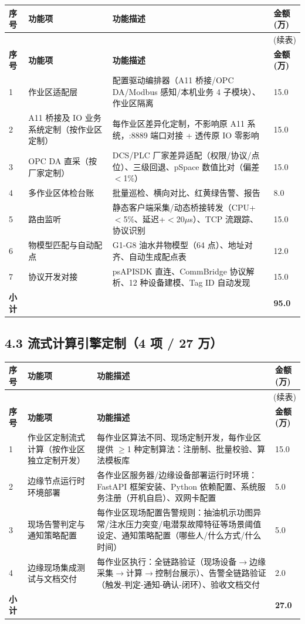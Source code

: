 \documentclass[11pt,a4paper]{ctexart}
\begin{document}
\begin{longtable}{p{1.2cm} p{3.8cm} p{7.1cm} p{1.7cm}}
\toprule
\textbf{序号} & \textbf{功能项} & \textbf{功能描述} & \textbf{金额(万)} \\
\midrule
\endfirsthead
\midrule
\multicolumn{4}{r}{(续表)} \\
\toprule
\textbf{序号} & \textbf{功能项} & \textbf{功能描述} & \textbf{金额(万)} \\
\midrule
\endhead
1 & 作业区适配层 & 配置驱动编排器（A11 桥接/OPC DA/Modbus 感知/本机业务 4 子模块）、作业区隔离 & 15.0 \\
2 & A11 桥接及 IO 业务系统定制（按作业区定制） & 每作业区差异化定制，不影响原 A11 系统，:8889 端口对接 + 透传原 IO 零影响 & 15.0 \\
3 & OPC DA 直采（按厂家定制） & DCS/PLC 厂家差异适配（权限/协议/点位）、三级回退、pSpace 数值比对（偏差 $<$1\%） & 15.0 \\
4 & 多作业区体检台账 & 批量巡检、横向对比、红黄绿告警、报告 & 8.0 \\
5 & 路由监听 & 静态客户端采集/动态桥接转发（CPU+$<$5\%、延迟+$<$20$\mu$s）、TCP 流跟踪、协议识别 & 15.0 \\
6 & 物模型匹配与自动配点 & G1-G8 油水井物模型（64 点）、地址对齐、自动生成配点表 & 12.0 \\
7 & 协议开发对接 & psAPISDK 直连、CommBridge 协议解析、12 种设备建模、Tag ID 自动发现 & 15.0 \\
\midrule
\textbf{小计} & & & \textbf{95.0} \\
\bottomrule
\end{longtable}

\subsection{4.3 流式计算引擎定制（4 项 / 27 万）}

\begin{longtable}{p{1.2cm} p{3.8cm} p{7.1cm} p{1.7cm}}
\toprule
\textbf{序号} & \textbf{功能项} & \textbf{功能描述} & \textbf{金额(万)} \\
\midrule
\endfirsthead
\midrule
\multicolumn{4}{r}{(续表)} \\
\toprule
\textbf{序号} & \textbf{功能项} & \textbf{功能描述} & \textbf{金额(万)} \\
\midrule
\endhead
1 & 作业区定制流式计算（按作业区独立定制开发） & 每作业区算法不同、现场定制开发，每作业区提供 $\geq$1 种定制算法：注册制、批量校验、算法模板库 & 15.0 \\
2 & 边缘节点运行时环境部署 & 各作业区服务器/边缘设备部署运行时环境：FastAPI 框架安装、Python 依赖配置、系统服务注册（开机自启）、双网卡配置 & 5.0 \\
3 & 现场告警判定与通知策略配置 & 每作业区现场配置告警规则：抽油机示功图异常/注水压力突变/电潜泵故障特征等场景阈值设定、通知策略配置（哪些人/什么方式/什么时间） & 5.0 \\
4 & 边缘现场集成测试与文档交付 & 每作业区执行：全链路验证（现场设备$\rightarrow$边缘采集$\rightarrow$计算$\rightarrow$控制台展示）、告警全链路验证（触发-判定-通知-确认-闭环）、验收文档交付 & 2.0 \\
\midrule
\textbf{小计} & & & \textbf{27.0} \\
\bottomrule
\end{longtable}
\end{document}

